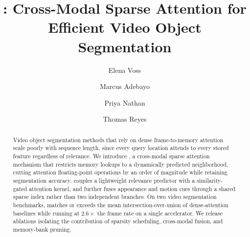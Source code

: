 \documentclass[runningheads]{llncs}
\begin{document}
\title{\methodname: Cross-Modal Sparse Attention for Efficient Video Object Segmentation}
\titlerunning{\methodname}

\author{Elena Voss \and Marcus Adebayo \and Priya Nathan \and
Thomas Reyes}

\maketitle

\noindent{}

\begin{abstract}
Video object segmentation methods that rely on dense frame-to-memory attention scale poorly
with sequence length, since every query location attends to every stored feature regardless
of relevance. We introduce \methodname{}, a cross-modal sparse attention mechanism that
restricts memory lookups to a dynamically predicted neighborhood, cutting attention
floating-point operations by an order of magnitude while retaining segmentation accuracy.
\methodname{} couples a lightweight relevance predictor with a similarity-gated attention
kernel, and further fuses appearance and motion cues through a shared sparse index rather
than two independent branches. On two video segmentation benchmarks, \methodname{} matches
or exceeds the mean intersection-over-union of dense-attention baselines while running at
$2.6\times$ the frame rate on a single accelerator. We release ablations isolating the
contribution of sparsity scheduling, cross-modal fusion, and memory-bank pruning.
\end{abstract}












\end{document}
